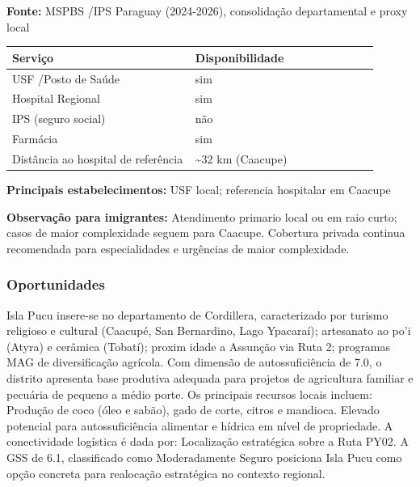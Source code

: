 \textbf{Fonte:} MSPBS /\allowbreak  IPS Paraguay (2024-2026), consolidação
departamental e proxy local

{\def\LTcaptype{none} %
\begin{longtable}{@{}>{\raggedright\arraybackslash}p{0.45\linewidth} >{\raggedright\arraybackslash}p{0.45\linewidth}@{}}
\toprule\noalign{}
Serviço & Disponibilidade \\
\midrule\noalign{}
\endhead
\bottomrule\noalign{}
\endlastfoot
USF /\allowbreak  Posto de Saúde & sim \\
Hospital Regional & sim \\
IPS (seguro social) & não \\
Farmácia & sim \\
Distância ao hospital de referência & \textasciitilde32 km (Caacupe) \\
\end{longtable}
}

\textbf{Principais estabelecimentos:} USF local; referencia hospitalar
em Caacupe

\textbf{Observação para imigrantes:} Atendimento primario local ou em
raio curto; casos de maior complexidade seguem para Caacupe. Cobertura
privada continua recomendada para especialidades e urgências de maior
complexidade.
\newpage

\subsubsection*{Oportunidades}\label{oport-isla-pucu-0308}
Isla Pucu insere-se no departamento de Cordillera, caracterizado por turismo religioso e cultural (Caacupé, San Bernardino, Lago Ypacaraí); artesanato ao po'i (Atyra) e cerâmica (Tobatí); proxim idade a Assunção via Ruta 2; programas MAG de diversificação agrícola. Com dimensão de autossuficiência de 7.0, o distrito apresenta base produtiva adequada para projetos de agricultura familiar e pecuária de pequeno a médio porte. Os principais recursos locais incluem: Produção de coco (óleo e sabão), gado de corte, citros e mandioca. Elevado potencial para autossuficiência alimentar e hídrica em nível de propriedade. A conectividade logística é dada por: Localização estratégica sobre a Ruta PY02. A GSS de 6.1, classificado como Moderadamente Seguro posiciona Isla Pucu como opção concreta para realocação estratégica no contexto regional.

